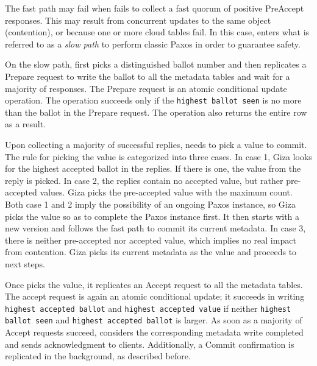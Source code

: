 The fast path may fail when {\name} fails to collect a fast quorum of
positive PreAccept responses. This may result from concurrent updates to the
same object (contention), or because one or more cloud tables fail. In this
case, {\name} enters what is referred to as a \emph{slow path} to perform
classic Paxos in order to guarantee safety.

On the slow path, {\name} first picks a distinguished ballot number and
then replicates a Prepare request to write the ballot to all the metadata tables
and wait for a majority of responses. The Prepare request is an atomic conditional
update operation. The operation succeeds only if the {\tt highest ballot seen}
is no more than the ballot in the Prepare request. The operation also returns
the entire row as a result.

Upon collecting a majority of successful replies, {\name} needs to pick
a value to commit. The rule for picking the value is categorized into three
cases. In case 1, Giza looks for the highest accepted ballot in the replies. If
there is one, the value from the reply is picked. In case 2, the replies contain
no accepted value, but rather pre-accepted values. Giza picks the pre-accepted
value with the maximum count. Both case 1 and 2
imply the possibility of an ongoing Paxos instance, so Giza picks the value so
as to complete the Paxos instance first. It then starts with a new version and
follows the fast path to commit its current metadata. In case 3, there is
neither pre-accepted nor accepted value, which implies no real impact from
contention. Giza picks its current metadata as the value and proceeds to next
steps.

Once {\name} picks the value, it replicates an Accept request to all the
metadata tables. The accept request is again an atomic conditional update; it
succeeds in writing {\tt highest accepted ballot} and {\tt highest accepted
  value} if neither {\tt highest ballot seen} and {\tt highest accepted ballot}
is larger. 
As soon as a majority of Accept requests succeed, \name considers
the corresponding metadata write completed and sends acknowledgment to clients. 
Additionally, a Commit confirmation is replicated in the background, as
described before.

